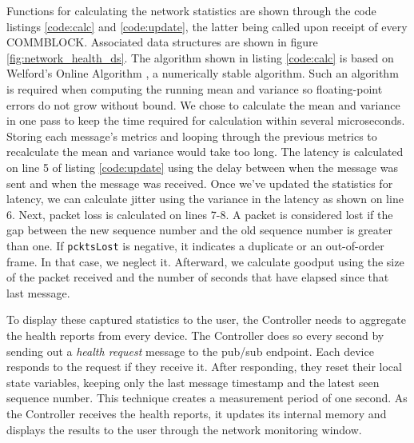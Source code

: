 \documentclass[letterpaper,twocolumn,12pt]{article}
\begin{document}
Functions for calculating the network statistics are shown through the code listings \ref{code:calc} and \ref{code:update}, the latter being called upon receipt of every COMMBLOCK. 
Associated data structures are shown in figure \ref{fig:network_health_ds}. The algorithm shown in listing \ref{code:calc} 
is based on Welford's Online Algorithm \cite{welford_62}, a numerically stable algorithm.
Such an algorithm is required when computing the running mean and variance so floating-point errors do not grow without bound. We chose to calculate the mean and variance in one pass to keep the time required for calculation within several microseconds. Storing each message's metrics and looping through the previous metrics to recalculate the mean and variance would take too long. The latency is calculated on line 5 of listing \ref{code:update} using the delay between when the message was sent and when the message was received. Once we've updated the statistics for latency, we can calculate jitter using the variance in the latency as shown on line 6. Next, packet loss is calculated on lines 7-8. A packet is considered lost if the gap between the new sequence number and the old sequence number is greater than one. If \texttt{pcktsLost} is negative, it indicates a duplicate or an out-of-order frame. In that case, we neglect it.
Afterward, we calculate goodput using the size of the packet received and the number of seconds that have elapsed since that last message.  

To display these captured statistics to the user, the Controller needs to aggregate the health reports from every device. The Controller does so every second by sending out a \textit{health request} message to the pub/sub endpoint. Each device responds to the request if they receive it. After responding, they reset their local state variables, keeping only the last message timestamp and the latest seen sequence number. This technique creates a measurement period of one second. As the Controller receives the health reports, it updates its internal memory and displays the results to the user through the network monitoring window.
\end{document}
